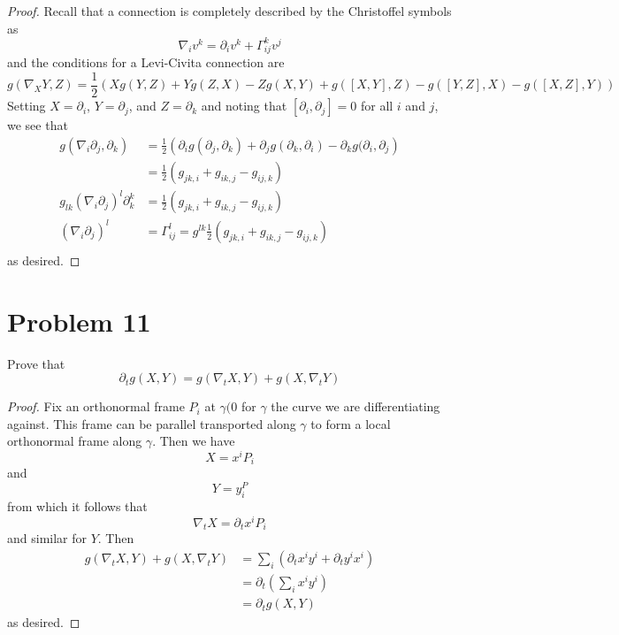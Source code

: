 \documentclass[fontsize=11pt]{scrartcl} %
\numberwithin{equation}{section} %
\numberwithin{figure}{section} %
\numberwithin{table}{section} %
\begin{document}
\begin{proof}
    Recall that a connection is completely described by the Christoffel symbols
    as
    \[
        \nabla_iv^k = \partial_iv^k + \Gamma_{ij}^kv^j
    \]
    and the conditions for a Levi-Civita connection are
    \[
        g(\nabla_XY,Z) = \frac{1}{2} \left( Xg(Y,Z) + Yg(Z,X) - Zg(X,Y)
        + g([X,Y],Z) -g([Y,Z],X) - g([X,Z],Y)\right)
    \]
    Setting $X=\partial_i$, $Y=\partial_j$, and $Z=\partial_k$ and noting that
    $[\partial_i,\partial_j]=0$ for all $i$ and $j$, we see that
    \[
        \begin{aligned}
        g(\nabla_i\partial_j,\partial_k) &= \frac{1}{2}\left(
            \partial_ig(\partial_j,\partial_k) +
            \partial_jg(\partial_k,\partial_i) -
            \partial_kg(\partial_i,\partial_j \right)\\
            &= \frac{1}{2}\left( 
            g_{jk,i} + g_{ik,j} - g_{ij,k}\right)\\
            g_{lk}(\nabla_i\partial_j)^l\partial_k^k 
            &= \frac{1}{2}\left( 
            g_{jk,i} + g_{ik,j} - g_{ij,k}\right)\\
            (\nabla_i\partial_j)^l &= \Gamma_{ij}^l
            = g^{lk}\frac{1}{2}\left( 
            g_{jk,i} + g_{ik,j} - g_{ij,k}\right)\\
        \end{aligned}
    \]
    as desired.
\end{proof}

\section*{Problem 11}
Prove that
\[
    \partial_tg(X,Y) = g(\nabla_tX,Y) + g(X,\nabla_tY)
\]

\begin{proof}
    Fix an orthonormal frame $P_i$ at $\gamma(0$ for $\gamma$ the curve we are
        differentiating against. This frame can be parallel transported along
        $\gamma$ to form a local orthonormal frame along $\gamma$. Then we have
        \[
        X = x^iP_i
        \]
        and
        \[
        Y = y^P_i
        \]
        from which it follows that
        \[
            \nabla_tX = \partial_tx^iP_i
        \]
        and similar for $Y$. Then
        \[
        \begin{aligned}
            g(\nabla_tX,Y)+g(X,\nabla_tY) &= \sum_i\left( \partial_tx^iy^i +
            \partial_ty^ix^i \right)\\
            &=\partial_t(\sum_i x^iy^i)\\
            &=\partial_tg(X,Y)
        \end{aligned}
        \]
        as desired.
\end{proof}
\end{document}
